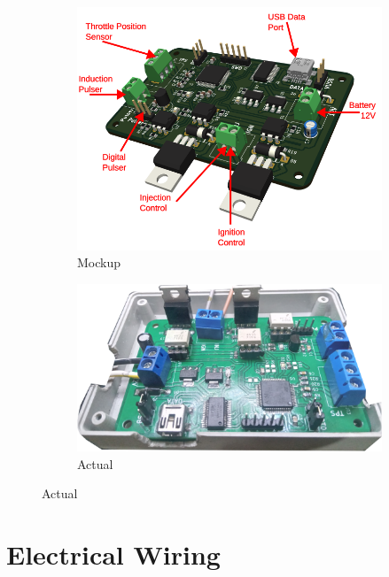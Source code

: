 \documentclass[a4paper,12pt,oneside,pdflatex,italian,final,twocolumn]{article}
\begin{document}
	\begin{figure}[h]
		\centering
		\begin{subfigure}{0.45\textwidth}
			\includegraphics[width=\textwidth]{images/ecuparts.png}
			\caption{Mockup}
		\end{subfigure}
		\begin{subfigure}{0.45\textwidth}
			\includegraphics[width=\textwidth]{images/unit.png}
			\caption{Actual}
		\end{subfigure}
	\end{figure}

	\section{Electrical Wiring}
	
\end{document}
